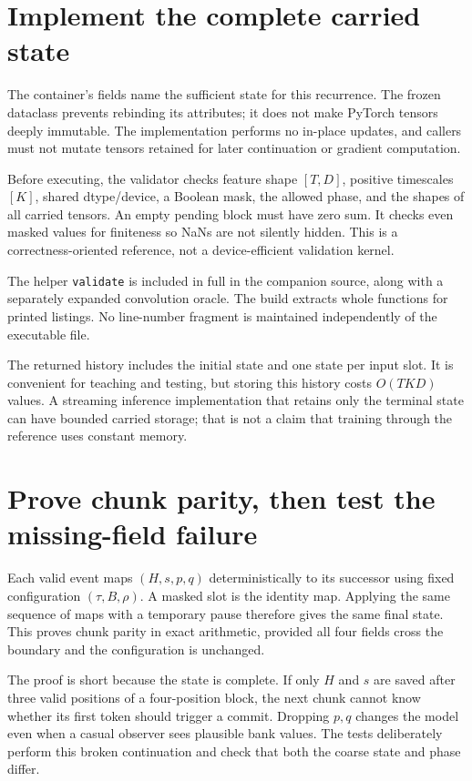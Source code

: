 \section{Implement the complete carried state}

The container's fields name the sufficient state for this recurrence.
The frozen dataclass prevents rebinding its attributes; it does not make
PyTorch tensors deeply immutable. The implementation performs no in-place
updates, and callers must not mutate tensors retained for later continuation
or gradient computation.

Before executing, the validator checks feature shape $[T,D]$, positive
timescales $[K]$, shared dtype/device, a Boolean mask, the allowed phase, and
the shapes of all carried tensors. An empty pending block must have zero sum.
It checks even masked values for finiteness so NaNs are not silently hidden.
This is a correctness-oriented reference, not a device-efficient validation
kernel.

The helper \texttt{validate} is included in full in the companion source,
along with a separately expanded convolution oracle. The build extracts
whole functions for printed listings. No line-number fragment is maintained
independently of the executable file.

The returned history includes the initial state and one state per input slot.
It is convenient for teaching and testing, but storing this history costs
$O(TKD)$ values. A streaming inference implementation that retains only the
terminal state can have bounded carried storage; that is not a claim that
training through the reference uses constant memory.

\section{Prove chunk parity, then test the missing-field failure}

Each valid event maps $(H,s,p,q)$ deterministically to its successor using
fixed configuration $(\tau,B,\rho)$. A masked slot is the identity map.
Applying the same sequence of maps with a temporary pause therefore gives
the same final state. This proves chunk parity in exact arithmetic,
provided all four fields cross the boundary and the configuration is unchanged.

The proof is short because the state is complete. If only $H$ and $s$
are saved after three valid positions of a four-position block, the next
chunk cannot know whether its first token should trigger a commit.
Dropping $p,q$ changes the model even when a casual observer sees plausible
bank values. The tests deliberately perform this broken continuation and
check that both the coarse state and phase differ.

